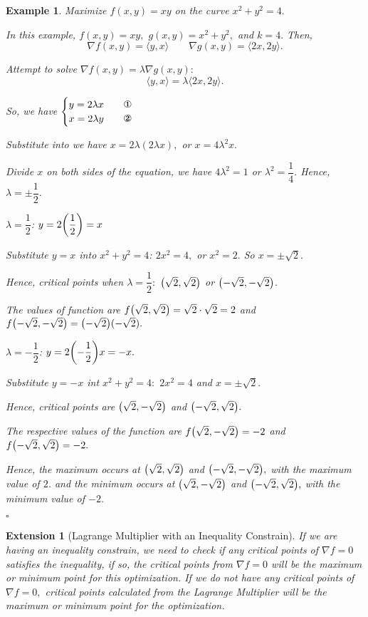 \documentclass[12pt,a4paper]{article}
\newtheorem{eg}{Example}[subsection]
\newenvironment*{ans}{\par\indent{\textit{Answer. }}\par}{\par\hfill{$\square$}\par}
\newtheorem*{ext}{\indent Extension}
\begin{document}
\begin{eg}
Maximize $f(x,y)=xy$ on the curve $x^2+y^2=4.$
\begin{ans}
	In this example, $f(x,y)=xy,$ $g(x,y)=x^2+y^2,$ and $k=4.$ Then, \[\nabla f(x,y)=\langle y, x\rangle\qquad \nabla g(x,y)=\langle 2x, 2y\rangle.\]\par Attempt to solve $\nabla f(x,y)=\lambda\nabla g(x,y): $\[\langle y,x\rangle=\lambda\langle 2x,2y\rangle.\]\par So, we have $\begin{cases}y=2\lambda x\qquad\text{\ding{172}}\\x=2\lambda y\qquad\text{\ding{173}}\end{cases}$\par Substitute  into  we have $x=2\lambda(2\lambda x),$ or $x=4\lambda^2x.$\par Divide $x$ on both sides of the equation, we have $4\lambda^2=1$ or $\lambda^2=\dfrac{1}{4}.$ Hence, $\lambda=\pm\dfrac{1}{2}.$\par $\boxed{\lambda=\dfrac{1}{2}}$: $y=2\qty(\dfrac{1}{2})=x$\par\hspace{5mm} Substitute $y=x$ into $x^2+y^2=4$: $2x^2=4,$ or $x^2=2.$ So $x=\pm\sqrt{2}.$\par\hspace{5mm} Hence, critical points when $\lambda=\dfrac{1}{2}:$ $\qty(\sqrt{2},\sqrt{2})$ or $\qty(-\sqrt{2},-\sqrt{2})$.\par\hspace{5mm} The values of function are $f\qty(\sqrt{2},\sqrt{2})=\sqrt{2}\cdot\sqrt{2}=2$ and $f\qty(-\sqrt{2},-\sqrt{2})=\qty(-\sqrt{2})(-\sqrt{2}).$\par $\boxed{\lambda=-\dfrac{1}{2}}$: $y=2\qty(-\dfrac{1}{2})x=-x.$\par\hspace{5mm} Substitute $y=-x$ int $x^2+y^2=4:$ $2x^2=4$ and $x=\pm\sqrt{2}.$\par\hspace{5mm} Hence, critical points are $\qty(\sqrt{2},-\sqrt{2})$ and $\qty(-\sqrt{2},\sqrt{2}).$\par\hspace{5mm} The respective values of the function are $f\qty(\sqrt{2},-\sqrt{2})=-2$ and $f\qty(-\sqrt{2},\sqrt{2})=-2.$\par Hence, the maximum occurs at $\qty(\sqrt{2},\sqrt{2})$ and $\qty(-\sqrt{2},-\sqrt{2}),$ with the maximum value of $2$. and the minimum occurs at $\qty(\sqrt{2},-\sqrt{2})$ and $\qty(-\sqrt{2},\sqrt{2}),$ with the minimum value of $-2.$
\end{ans}	
\end{eg}
\begin{ext}[Lagrange Multiplier with an Inequality Constrain]
	If we are having an inequality constrain, we need to check if any critical points of $\nabla f=0$ satisfies the inequality, if so, the critical points from $\nabla f=0$ will be the maximum or minimum point for this optimization. If we do not have any critical points of $\nabla f=0,$ critical points calculated from the Lagrange Multiplier will be the maximum or minimum point for the optimization. 
\end{ext}
\end{document}
